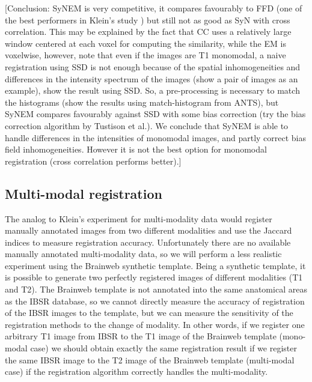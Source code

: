 \documentclass[11pt]{article}
\begin{document}
[Conclusion: SyNEM is very competitive, it compares favourably to FFD (one of the best performers in Klein's study \cite{Klein2009}) but still not as good as SyN with cross correlation. This may be explained by the fact that CC uses a relatively large window centered at each voxel for computing the similarity, while the EM is voxelwise, however, note that even if the images are T1 monomodal, a naive registration using SSD is not enough because of the spatial inhomogeneities and differences in the intensity spectrum of the images (show a pair of images as an example), show the result using SSD. So, a pre-processing is necessary to match the histograms (show the results using match-histogram from ANTS), but SyNEM compares favourably against SSD with some bias correction (try the bias correction algorithm by Tustison et al.). We conclude that SyNEM is able to handle differences in the intensities of monomodal images, and partly correct bias field inhomogeneities. However it is not the best option for monomodal registration (cross correlation performs better).]

\subsection{Multi-modal registration}
The analog to Klein's experiment for multi-modality data would register manually annotated images from two different modalities and use the Jaccard indices to measure registration accuracy. Unfortunately there are no available manually annotated multi-modality data, so we will perform a less realistic experiment using the Brainweb synthetic template. Being a synthetic template, it is possible to generate two perfectly registered images of different modalities (T1 and T2). The Brainweb template is not annotated into the same anatomical areas as the IBSR database, so we cannot directly measure the accuracy of registration of the IBSR images to the template, but we can measure the sensitivity of the registration methods to the change of modality. In other words, if we register one arbitrary T1 image from IBSR to the T1 image of the Brainweb template (mono-modal case) we should obtain exactly the same registration result if we register the same IBSR image to the T2 image of the Brainweb template (multi-modal case) if the registration algorithm correctly handles the multi-modality.



\end{document}
